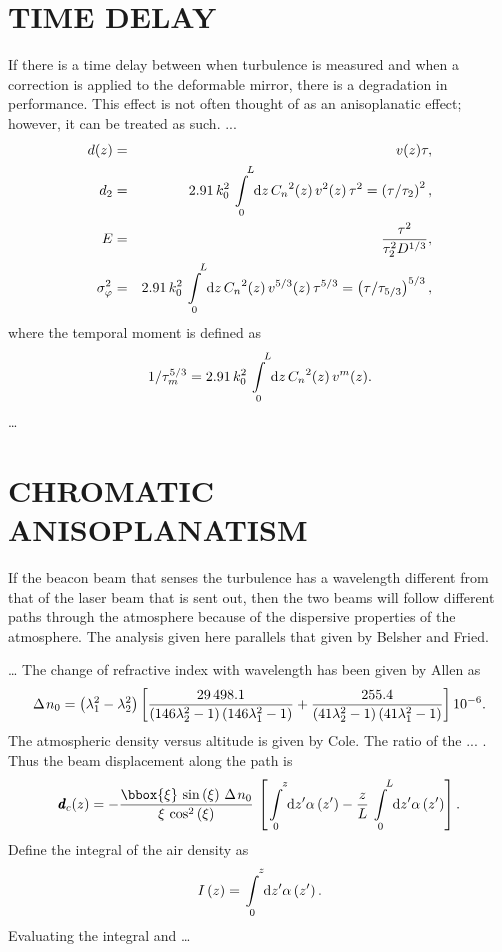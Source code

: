 \section{ TIME DELAY}
\label{td}
If there is a time delay  between when turbulence is measured and
when a correction is applied to the deformable mirror, there is  a
degradation in performance.\cite{7}  This effect is not often
thought of  as an anisoplanatic effect; however, it can be treated
as such.  ...  \begin{eqnarray}   d(z)&=&v(z)\tau   ,  \\
d_2&=&2.91\,k_0^2\int\limits_{\,\,\, 0}^{\,\,\,\,\,\, L} {\rm
d}z\,{C_n}^2(z)\,v^2(z)\,\tau ^2=\left(  {\tau / \tau _2} \right)^2
,   \\    E&=&{{\tau ^2} \over {\tau _2^2D^{1/ 3}}}  ,  \\  \sigma
_\varphi ^2&=&2.91\,k_0^2\int\limits_{\,\,\, 0}^{\,\,\,\,\,\, L}  {\rm
d}z\,{C_n}^2(z)\,v^{5/ 3}(z)\,\tau ^{5/ 3}=\left( {\tau / \tau _{5/
3}} \right)^{5/ 3}  ,   \end{eqnarray} where the temporal moment is
defined as  \begin{eqnarray}  1/ \tau _m^{5/
3}=2.91\,k_0^2\int\limits_{\,\,\, 0}^{\,\,\,\,\,\, L}  {\rm
d}z\,{C_n}^2(z)\,v^m(z)  .   \end{eqnarray}
\ldots

\section{ CHROMATIC ANISOPLANATISM}
\label{ca}
If the beacon beam that senses the  turbulence has a wavelength
different from that of the laser beam that  is sent out, then the
two beams will follow different paths through the  atmosphere
because of the dispersive properties of the atmosphere.  The
analysis given here parallels that given by Belsher and
Fried.\cite{1}

\ldots
The change of refractive index with wavelength has been  given by
Allen\cite{16} as   \begin{eqnarray} \Delta \kern 1ptn_0=\left(
{\lambda _1^2-\lambda  _2^2} \right)\left[ {{{29\,498.1} \over
{\left( {146\lambda _2^2-1}  \right)\left( {146\lambda _1^2-1}
\right)}}+{{255.4} \over {\left(  {41\lambda _2^2-1} \right)\left(
{41\lambda _1^2-1} \right)}}}  \right]10^{-6}  .
\end{eqnarray} The atmospheric density versus altitude is  given by
Cole.\cite{17}  The ratio of the ... .  Thus the beam  displacement
along the path is  \begin{eqnarray} {\rm  \pmb{d}}_c(z)=-{{{
\rm \bbox{\xi}} \,\sin  \left( \xi  \right)\,\Delta \kern 1ptn_0} \over
{\xi \,\cos ^2\left( \xi   \right)}}\,\left[ {\int\limits_{\,\,\,
0}^{\,\,\,\,\,\, z} {\rm d}z' \alpha \left( {z'} \right)-{z  \over
L}\int\limits_{\,\,\, 0}^{\,\,\,\,\,\, L} {\rm d}z'\alpha \left( {z'}
\right)} \right]  .   \end{eqnarray} Define the integral of the air
density as  \begin{eqnarray} I\left( z \right)=\int\limits_{\,\,\,
0}^{\,\,\,\,\,\, z}{\rm d}z'\alpha  \left( {z'} \right)  .
\end{eqnarray}  Evaluating the integral and     \ldots

